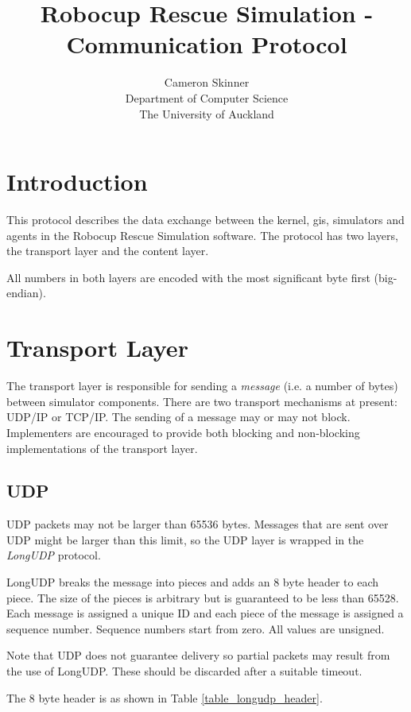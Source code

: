 \title{Robocup Rescue Simulation - Communication Protocol}
\author{Cameron Skinner\\Department of Computer Science\\The University of Auckland}

\maketitle
\section{Introduction}
This protocol describes the data exchange between the kernel, gis, simulators and agents in the Robocup Rescue Simulation software. The protocol has two layers, the transport layer and the content layer.

All numbers in both layers are encoded with the most significant byte first (big-endian).

\section{Transport Layer}
The transport layer is responsible for sending a \textit{message} (i.e. a number of bytes) between simulator components. There are two transport mechanisms at present: UDP/IP or TCP/IP. The sending of a message may or may not block. Implementers are encouraged to provide both blocking and non-blocking implementations of the transport layer.

\subsection{UDP}
UDP packets may not be larger than 65536 bytes. Messages that are sent over UDP might be larger than this limit, so the UDP layer is wrapped in the \textit{LongUDP} protocol.

LongUDP breaks the message into pieces and adds an 8 byte header to each piece. The size of the pieces is arbitrary but is guaranteed to be less than 65528. Each message is assigned a unique ID and each piece of the message is assigned a sequence number. Sequence numbers start from zero. All values are unsigned.

Note that UDP does not guarantee delivery so partial packets may result from the use of LongUDP. These should be discarded after a suitable timeout.

The 8 byte header is as shown in Table \ref{table_longudp_header}.

